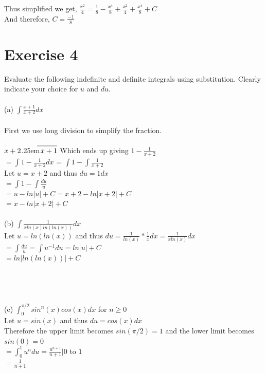 \documentclass[12pt]{article}
\newcommand\Mydiv[2]{%
$\strut#1$\kern.25em\smash{\raise.3ex\hbox{$\big)$}}$\mkern-8mu
        \overline{\enspace\strut#2}$}
\begin{document}
\noindent Thus simplified we get, $\frac{x^2}{4} = \frac{1}{8}-\frac{x^4}{8} + \frac{x^2}{4}+\frac{x^4}{8}+C$\\
And therefore, $C = \frac{-1}{8}$

\section{Exercise 4}
Evaluate the following indefinite and definite integrals using substitution. Clearly indicate your choice for $u$ and $du$. \\~\\
(a) $\int\frac{x+1}{x+2}dx$\\~\\
First we use long division to simplify the fraction. \\~\\
\Mydiv{x+2}{x+1} Which ends up giving $1 - \frac{1}{x+2}$\\
$= \int 1-\frac{1}{x+2}dx$ = $\int 1 - \int \frac{1}{x+2}$\\
Let $u = x+2$ and thus $du = 1dx$\\
$= \int 1 - \int \frac{du}{u}$\\
$= u - ln|u| + C = x + 2 - ln|x+2| + C$\\
$= x - ln|x+2| + C$\\~\\

\noindent(b) $\int \frac{1}{xln(x)ln(ln(x))}dx$\\
Let $u = ln(ln(x))$ and thus $du = \frac{1}{ln(x)} * \frac{1}{x} dx = \frac{1}{xln(x)} dx$\\
$= \int \frac{du}{u} = \int u^{-1} du = ln|u| + C$\\
$= ln|ln(ln(x))|+C$ \\~\\~\\~\\~\\

\noindent(c) $\int_{0}^{\pi/2} sin^n(x)cos(x)dx$ for $n \geq 0$\\
Let $u = sin(x)$ and thus $du = cos(x)dx$\\
Therefore the upper limit becomes $sin(\pi/2) = 1$ and the lower limit becomes $sin(0) = 0$\\
$= \int_0^{1} u^n du = \frac{u^{n+1}}{n+1} \bigg| 0$ to $1$\\
$=\frac{1}{n+1}$
\end{document}
